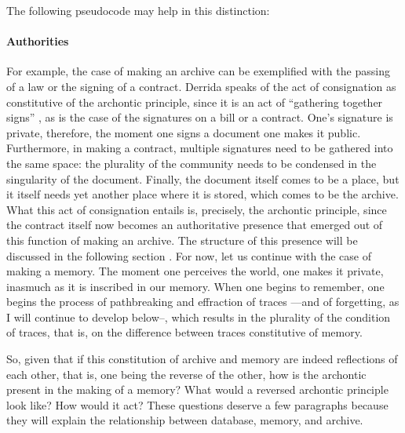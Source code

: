 	The following pseudocode may help in this distinction:



	\paragraph{Authorities}
	For example, the case of making an archive can be exemplified with the passing of a law or the signing of a contract. Derrida speaks of the act of consignation as constitutive of the archontic principle, since it is an act of ``gathering together signs'' \parencite[10]{Der95:Arc}, as is the case of the signatures on a bill or a contract. One's signature is private, therefore, the moment one signs a document one makes it public. Furthermore, in making a contract, multiple signatures need to be gathered into the same space: the plurality of the community needs to be condensed in the singularity of the document. Finally, the document itself comes to be a place, but it itself needs yet another place where it is stored, which comes to be the archive. What this act of consignation entails is, precisely, the archontic principle, since the contract itself now becomes an authoritative presence that emerged out of this function of making an archive. The structure of this presence will be discussed in the following section . For now, let us continue with the case of making a memory. The moment one perceives the world, one makes it private, inasmuch as it is inscribed in our memory. When one begins to remember, one begins the process of pathbreaking and effraction of traces ---and of forgetting, as I will continue to develop below--, which results in the plurality of the condition of traces, that is, on the difference between traces constitutive of memory.

	So, given that if this constitution of archive and memory are indeed reflections of each other, that is, one being the reverse of the other, how is the archontic present in the making of a memory? What would a reversed archontic principle look like? How would it act? These questions deserve a few paragraphs because they will explain the relationship between database, memory, and archive. 

